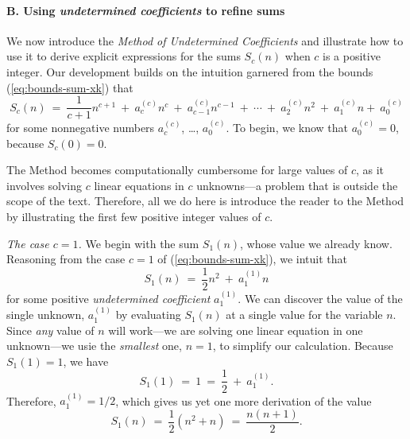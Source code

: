 \paragraph{B. Using {\em undetermined coefficients} to refine sums}

We now introduce the {\em Method of Undetermined Coefficients}
and illustrate how to use it to derive explicit expressions for the
sums $S_c(n)$ when $c$ is a positive integer.  Our development builds
on the intuition garnered from the bounds (\ref{eq:bounds-sum-xk})
that
\[ S_c(n) \ = \ \frac{1}{c+1} n^{c+1} \ + \ a^{(c)}_c n^c \ + \
a^{(c)}_{c-1} n^{c-1} \ + \ \cdots \ + \ a^{(c)}_2 n^2 \ + \ a^{(c)}_1 n
 + \ a^{(c)}_0
\]
for some nonnegative numbers  
$a^{(c)}_c$, \ldots,
$a^{(c)}_0$.  To begin, we know that $a^{(c)}_0 = 0$, because $S_c(0)
= 0$.
\medskip

\noindent {}
\medskip

The Method becomes computationally cumbersome for large values
of $c$, as it involves solving $c$ linear equations in $c$ unknowns---a problem that is
outside the scope of the text.  Therefore, all we do here is introduce the reader to the
Method by illustrating the first few positive integer values of $c$.

\medskip

{\it The case $c=1$.}
%
We begin with the sum $S_1(n)$, whose value we already know.
Reasoning from the case $c=1$ of (\ref{eq:bounds-sum-xk}), we intuit
that
\[ S_1(n) \ = \ \frac{1}{2} n^2 \ + \ a^{(1)}_1 n \]
for some positive {\it undetermined coefficient} $a^{(1)}_1$.  We can
discover the value of the single unknown, $a^{(1)}_1$ by evaluating
$S_1(n)$ at a single value for the variable $n$.  Since {\em any} value of $n$
will work---we are solving one linear equation in one unknown---we usie
the {\em smallest} one, $n=1$, to simplify our calculation.  Because $S_1(1) = 1$, we have
\[ S_1(1) \ = \ 1 \ = \ \frac{1}{2} \ + \ a^{(1)}_1. \]
Therefore, $a^{(1)}_1 = 1/2$, which gives us yet one more derivation
of the value
\[ S_1(n) \ = \ \frac{1}{2} \left( n^2 + n \right) \ = \ 
\frac{n(n+1)}{2}.
\]

\medskip

